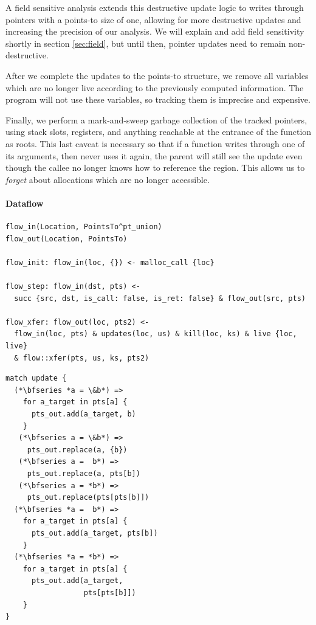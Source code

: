 A field sensitive analysis extends this destructive update logic to writes through pointers with a points-to size of one, allowing for more destructive updates and increasing the precision of our analysis.
We will explain and add field sensitivity shortly in section \ref{sec:field}, but until then, pointer updates need to remain non-destructive.

After we complete the updates to the points-to structure, we remove all variables which are no longer live according to the previously computed information.
The program will not use these variables, so tracking them is imprecise and expensive.

Finally, we perform a mark-and-sweep garbage collection of the tracked pointers, using stack slots, registers, and anything reachable at the entrance of the function as roots.
This last caveat is necessary so that if a function writes through one of its arguments, then never uses it again, the parent will still see the update even though the callee no longer knows how to reference the region.
This allows us to \emph{forget} about allocations which are no longer accessible.

\paragraph{Dataflow}
\begin{lstlisting}[float=*t, caption={Flow Sensitive Pointer Analysis Rules}, label=lst:flowrules]
flow_in(Location, PointsTo^pt_union)
flow_out(Location, PointsTo)

flow_init: flow_in(loc, {}) <- malloc_call {loc}

flow_step: flow_in(dst, pts) <-
  succ {src, dst, is_call: false, is_ret: false} & flow_out(src, pts)

flow_xfer: flow_out(loc, pts2) <-
  flow_in(loc, pts) & updates(loc, us) & kill(loc, ks) & live {loc, live}
  & flow::xfer(pts, us, ks, pts2)
\end{lstlisting}
\begin{lstlisting}[float=t, caption={Process Update}, label=lst:process]
match update {
  (*\bfseries *a = \&b*) =>
    for a_target in pts[a] {
      pts_out.add(a_target, b)
    }
   (*\bfseries a = \&b*) =>
     pts_out.replace(a, {b})
   (*\bfseries a =  b*) =>
     pts_out.replace(a, pts[b])
   (*\bfseries a = *b*) =>
     pts_out.replace(pts[pts[b]])
  (*\bfseries *a =  b*) =>
    for a_target in pts[a] {
      pts_out.add(a_target, pts[b])
    }
  (*\bfseries *a = *b*) =>
    for a_target in pts[a] {
      pts_out.add(a_target,
                  pts[pts[b]])
    }
}
\end{lstlisting}


